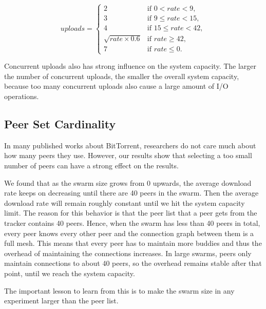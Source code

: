 \documentclass[10pt,letterpaper,twocolumn]{article}
\begin{document}
\begin{equation}
  \label{eq:uploads}
  uploads = \left\{
    \begin{array}{rl}
      2 & \text{if } 0< rate < 9,\\
      3 & \text{if } 9 \leqslant rate < 15,\\
      4 & \text{if } 15 \leqslant rate < 42, \\
      \sqrt{rate \times 0.6} & \text{if } rate \geqslant 42, \\
      7 & \text{if } rate \leqslant 0.
    \end{array} \right.
\end{equation}

Concurrent uploads also has strong influence on the system capacity.
The larger the number of concurrent uploads, the smaller the overall
system capacity, because too many concurrent uploads also cause a
large amount of I/O operations.

\subsection{Peer Set Cardinality}
\label{sec:peer-set-cardinality}

In many published works about BitTorrent, researchers do not care much
about how many peers they use. However, our results show that
selecting a too small number of peers can have a strong effect on the
results. 



We found that as the swarm size grows from 0 upwards, the average
download rate keeps on decreasing until there are 40 peers in the
swarm. Then the average download rate will remain roughly constant
until we hit the system capacity limit. The reason for this behavior
is that the peer list that a peer gets from the tracker contains 40
peers. Hence, when the swarm has less than 40 peers in total, every
peer knows every other peer and the connection graph between them is a
full mesh. This means that every peer has to maintain more buddies and
thus the overhead of maintaining the connections increases. In large
swarms, peers only maintain connections to about 40 peers, so the
overhead remains stable after that point, until we reach the system
capacity. 



The important lesson to learn from this is to make the swarm size in
any experiment larger than the peer list.
\end{document}
